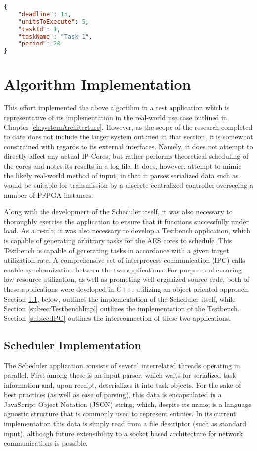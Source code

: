 \begin{lstlisting}[language=json, caption={An example task object, presented in JSON}, captionpos=b, float]
{
    "deadline": 15,
    "unitsToExecute": 5,
    "taskId": 1,
    "taskName": "Task 1",
    "period": 20
}
\end{lstlisting}

\section{Algorithm Implementation}\label{sec:Impl}

This effort implemented the above algorithm in a test application which is representative of its implementation in the real-world use case outlined in Chapter \ref{ch:systemArchitecture}. However, as the scope of the research completed to date does not include the larger system outlined in that section, it is somewhat constrained with regards to its external interfaces. Namely, it does not attempt to directly affect any actual IP Cores, but rather performs theoretical scheduling of the cores and notes its results in a log file. It does, however, attempt to mimic the likely real-world method of input, in that it parses serialized data such as would be suitable for transmission by a discrete centralized controller overseeing a number of PFPGA instances.

Along with the development of the Scheduler itself, it was also necessary to thoroughly exercise the application to ensure that it functions successfully under load. As a result, it was also necessary to develop a Testbench application, which is capable of generating arbitrary tasks for the AES cores to schedule. This Testbench is capable of generating tasks in accordance with a given target utilization rate. A comprehensive set of interprocess communication (IPC) calls enable synchronization between the two applications. For purposes of ensuring low resource utilization, as well as promoting well organized source code, both of these applications were developed in C++, utilizing an object-oriented approach. Section \ref{subsec:SchedulerImpl}, below, outlines the implementation of the Scheduler itself, while Section \ref{subsec:TestbenchImpl} outlines the implementation of the Testbench. Section \ref{subsec:IPC} outlines the interconnection of these two applications.

\subsection{Scheduler Implementation}\label{subsec:SchedulerImpl}
The Scheduler application consists of several interrelated threads operating in parallel. First among these is an input parser, which waits for serialized task information and, upon receipt, deserializes it into task objects. For the sake of best practices (as well as ease of parsing), this data is encapsulated in a JavaScript Object Notation (JSON) string, which, despite its name, is a language agnostic structure that is commonly used to represent entities. In its current implementation this data is simply read from a file descriptor (such as standard input), although future extensibility to a socket based architecture for network communications is possible.

